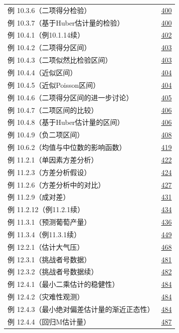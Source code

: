 \begin{longtable}{@{}p{}r@{}}
例 10.3.6（二项得分检验） & \hyperref[ex:10.3.6]{400} \\
例 10.3.7（基于Huber估计量的检验） & \hyperref[ex:10.3.7]{400} \\
例 10.4.1（例10.1.14续） & \hyperref[ex:10.4.1]{402} \\
例 10.4.2（二项得分区间） & \hyperref[ex:10.4.2]{403} \\
例 10.4.3（二项似然比检验区间） & \hyperref[ex:10.4.3]{403} \\
例 10.4.4（近似区间） & \hyperref[ex:10.4.4]{404} \\
例 10.4.5（近似Poisson区间） & \hyperref[ex:10.4.5]{404} \\
例 10.4.6（二项得分区间的进一步讨论） & \hyperref[ex:10.4.6]{405} \\
例 10.4.7（二项区间的比较） & \hyperref[ex:10.4.7]{406} \\
例 10.4.8（基于Huber估计量的区间） & \hyperref[ex:10.4.8]{406} \\
例 10.4.9（负二项区间） & \hyperref[ex:10.4.9]{408} \\
例 10.6.2（均值与中位数的影响函数） & \hyperref[ex:10.6.2]{419} \\
\addlinespace[.5em]
例 11.2.1（单因素方差分析） & \hyperref[ex:11.2.1]{422} \\
例 11.2.3（方差分析假设） & \hyperref[ex:11.2.3]{424} \\
例 11.2.6（方差分析中的对比） & \hyperref[ex:11.2.6]{427} \\
例 11.2.9（成对差） & \hyperref[ex:11.2.9]{431} \\
例 11.2.12（例11.2.1续） & \hyperref[ex:11.2.12]{434} \\
例 11.3.1（预测葡萄产量） & \hyperref[ex:11.3.1]{436} \\
例 11.3.4（例11.3.1续） & \hyperref[ex:11.3.4]{449} \\
\addlinespace[.5em]
例 12.2.1（估计大气压） & \hyperref[ex:12.2.1]{468} \\
例 12.3.1（挑战者号数据） & \hyperref[ex:12.3.1]{481} \\
例 12.3.2（挑战者号数据续） & \hyperref[ex:12.3.2]{482} \\
例 12.4.1（最小二乘估计的稳健性） & \hyperref[ex:12.4.1]{484} \\
例 12.4.2（灾难性观测） & \hyperref[ex:12.4.2]{484} \\
例 12.4.3（最小绝对偏差估计量的渐近正态性） & \hyperref[ex:12.4.3]{484} \\
例 12.4.4（回归M估计量） & \hyperref[ex:12.4.4]{487} \\

\end{longtable}
